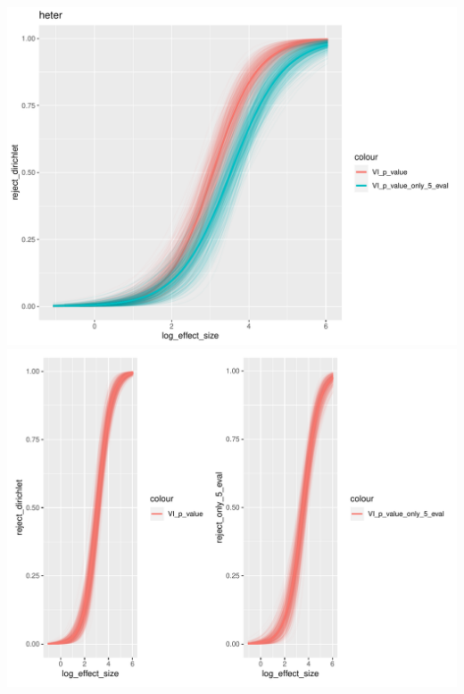 \documentclass[]{interact}
\theoremstyle{plain}%
\theoremstyle{definition}
\theoremstyle{remark}
\begin{document}
\includegraphics[width=1\linewidth]{paper_comparison_files/figure-latex/unnamed-chunk-11-1}
\includegraphics[width=1\linewidth]{paper_comparison_files/figure-latex/unnamed-chunk-11-2}
\end{document}
